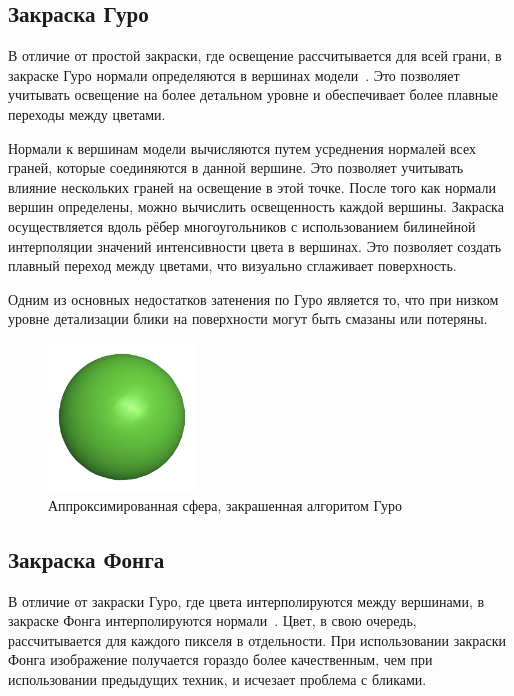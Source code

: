 \subsection{Закраска Гуро}

В отличие от простой закраски, где освещение рассчитывается для всей грани, в закраске Гуро нормали определяются в вершинах модели~\cite{lit3}. Это позволяет учитывать освещение на более детальном уровне и обеспечивает более плавные переходы между цветами.

Нормали к вершинам модели вычисляются путем усреднения нормалей всех граней, которые соединяются в данной вершине. Это позволяет учитывать влияние нескольких граней на освещение в этой точке. После того как нормали вершин определены, можно вычислить освещенность каждой вершины. Закраска осуществляется вдоль рёбер многоугольников с использованием билинейной интерполяции значений интенсивности цвета в вершинах. Это позволяет создать плавный переход между цветами, что визуально сглаживает поверхность.

Одним из основных недостатков затенения по Гуро является то, что при низком уровне детализации блики на поверхности могут быть смазаны или потеряны.

\clearpage

\begin{figure}[h] 
	\centering
	\includegraphics[width=0.35\textwidth]{images/gurou-shading.png}
	\caption{Аппроксимированная сфера, закрашенная алгоритом Гуро} 
	\label{fig:gurou-shading} 
\end{figure}

\subsection{Закраска Фонга}

В отличие от закраски Гуро, где цвета интерполируются между вершинами, в закраске Фонга интерполируются нормали~\cite{lit3}. Цвет, в свою очередь, рассчитывается для каждого пикселя в отдельности. При использовании закраски Фонга изображение получается гораздо более качественным, чем при использовании предыдущих техник, и исчезает проблема с бликами.

